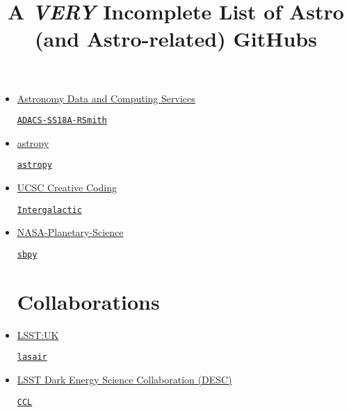 \documentclass[11pt,a4paper]{article}
\begin{document}
\title{A {\it VERY} Incomplete List of Astro (and Astro-related) GitHubs}
\maketitle



\begin{itemize}


\section*{Organisations}  


\item \href{https://github.com/ADACS-Australia}{Astronomy Data and Computing Services}
  \begin{itemize}
    \href{https://github.com/ADACS-Australia/ADACS-SS18A-RSmith}{{\tt ADACS-SS18A-RSmith}}
  \end{itemize}

\item \href{https://github.com/astropy}{astropy}
  \begin{itemize}
    \href{https://github.com/astropy/astropy}{{\tt astropy}}
  \end{itemize}

\item \href{https://github.com/CreativeCodingLab}{UCSC Creative Coding}
  \begin{itemize}
    \href{https://github.com/CreativeCodingLab/Intergalactic}{{\tt Intergalactic}}
  \end{itemize}

\item \href{https://github.com/NASA-Planetary-Science}{NASA-Planetary-Science}
  \begin{itemize}
    \href{https://github.com/NASA-Planetary-Science/sbpy}{{\tt sbpy}}
  \end{itemize}




\section*{Collaborations}  
\item \href{https://github.com/lsst-uk}{LSST:UK}
  \begin{itemize}
    \href{https://github.com/lsst-uk/lasair/}{{\tt lasair}}
  \end{itemize}

\item \href{https://github.com/LSSTDESC}{LSST Dark Energy Science Collaboration (DESC)}
  \begin{itemize}
    \href{https://github.com/LSSTDESC/CCL}{{\tt CCL}}
  \end{itemize}


\end{itemize}
\end{document}
